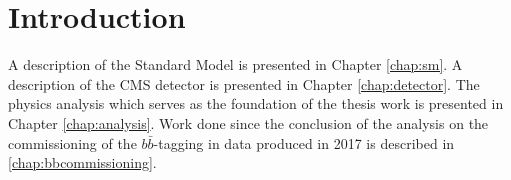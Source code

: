 \chapter{Introduction}



A description of the Standard Model is presented in Chapter \ref{chap:sm}. A description of the CMS detector is presented in Chapter \ref{chap:detector}. The physics analysis which serves as the foundation of the thesis work is presented in Chapter \ref{chap:analysis}. Work done since the conclusion of the analysis on the commissioning of the $b\bar{b}$-tagging in data produced in 2017 is described in \ref{chap:bbcommissioning}.

